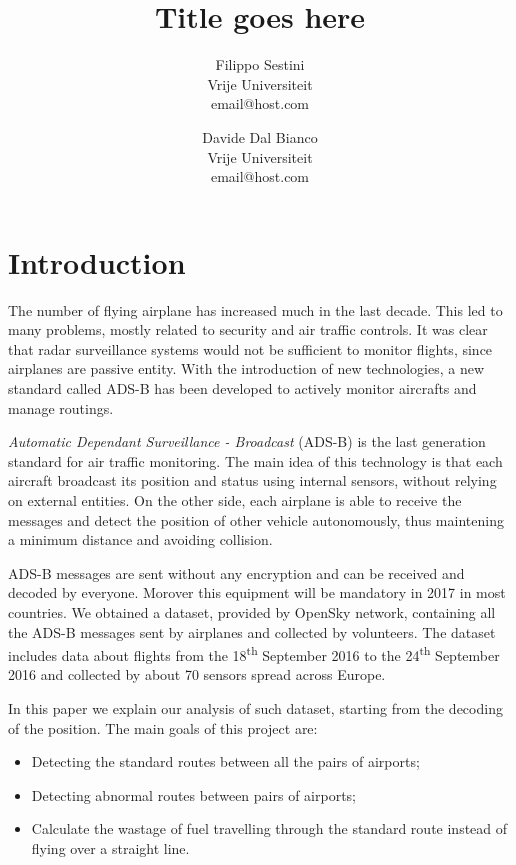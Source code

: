 \documentclass{vldb}
\title{Title goes here}
\author{Filippo Sestini \\ Vrije Universiteit \\ email@host.com \and
  Davide Dal Bianco \\ Vrije Universiteit \\ email@host.com}
\begin{document}
\maketitle

\section{Introduction}

The number of flying airplane has increased much in the last decade. This led to many problems, mostly related to security and air traffic controls. It was clear that radar surveillance systems would not be sufficient to monitor flights, since airplanes are passive entity. With the introduction of new technologies, a new standard called ADS-B has been developed to actively monitor aircrafts and manage routings.

\textit{Automatic Dependant Surveillance - Broadcast} (ADS-B) is the last generation standard for air traffic monitoring. The main idea of this technology is that each aircraft broadcast its position and status using internal sensors, without relying on external entities. On the other side, each airplane is able to receive the messages and detect the position of other vehicle autonomously, thus maintening a minimum distance and avoiding collision.

ADS-B messages are sent without any encryption and can be received and decoded by everyone. Morover this equipment will be mandatory in 2017 in most countries. We obtained a dataset, provided by OpenSky network, containing all the ADS-B messages sent by airplanes and collected by volunteers. The dataset includes data about flights from the 18\textsuperscript{th} September 2016 to the 24\textsuperscript{th} September 2016 and collected by about 70 sensors spread across Europe.

In this paper we explain our analysis of such dataset, starting from the decoding of the position. The main goals of this project are:
\begin{itemize}
  \item Detecting the standard routes between all the pairs of airports;
  \item Detecting abnormal routes between pairs of airports;
  \item Calculate the wastage of fuel travelling through the standard route instead of flying over a straight line.
\end{itemize}
\end{document}
